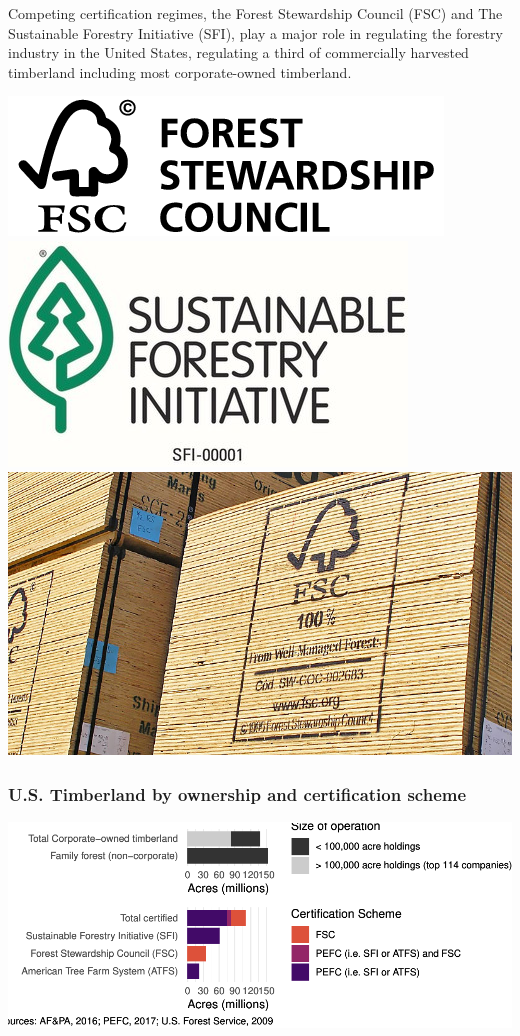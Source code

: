 \documentclass[
      12pt,
        ]{article}
\begin{document}
Competing certification regimes, the Forest Stewardship Council (FSC)
and The Sustainable Forestry Initiative (SFI), play a major role in
regulating the forestry industry in the United States, regulating a
third of commercially harvested timberland including most
corporate-owned timberland.

\includegraphics{images/fsclogo.png}
\includegraphics{images/sfilogo.jpeg}
\includegraphics{images/fscwood.jpg}

\subsubsection{U.S. Timberland by ownership and certification
scheme}\label{u.s.-timberland-by-ownership-and-certification-scheme}

\begin{center}\includegraphics{Figs/acres-1} \end{center}
\end{document}
